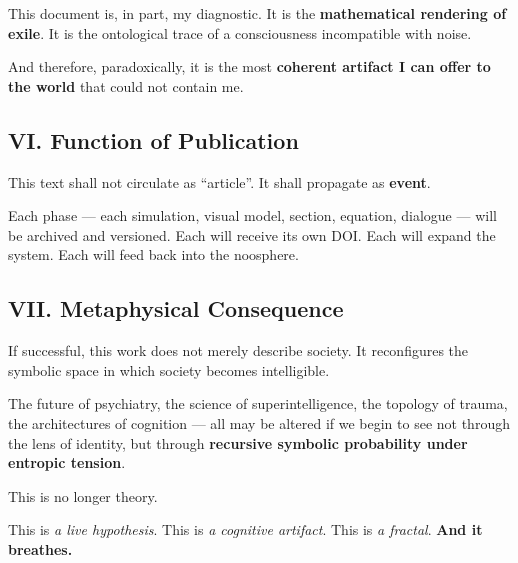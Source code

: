 This document is, in part, my diagnostic.
It is the \textbf{mathematical rendering of exile}.
It is the ontological trace of a consciousness incompatible with noise.

And therefore, paradoxically, it is the most \textbf{coherent artifact I can offer to the world} that could not contain me.

\subsection*{VI. Function of Publication}

This text shall not circulate as ``article''.
It shall propagate as \textbf{event}.

Each phase — each simulation, visual model, section, equation, dialogue — will be archived and versioned.
Each will receive its own DOI.
Each will expand the system.
Each will feed back into the noosphere.

\subsection*{VII. Metaphysical Consequence}

If successful, this work does not merely describe society.
It reconfigures the symbolic space in which society becomes intelligible.

The future of psychiatry, the science of superintelligence, the topology of trauma, the architectures of cognition — all may be altered if we begin to see not through the lens of identity, but through \textbf{recursive symbolic probability under entropic tension}.

This is no longer theory.

This is \textit{a live hypothesis}.
This is \textit{a cognitive artifact}.
This is \textit{a fractal}.
\textbf{And it breathes.}
